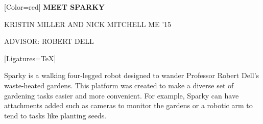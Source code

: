 \documentclass{article}
\begin{document}
{

	[Color=red]
	\fontsize{0.8in}{0.6in}\selectfont 
	\bfseries
	MEET SPARKY
}

\vspace{0.25in}

{
	\fontsize{0.55in}{0.6in}\selectfont
	KRISTIN MILLER {\fontsize{0.4in}{0.6in}\selectfont AND} NICK MITCHELL {\fontsize{0.4in}{0.6in}\selectfont ME '15}
}

\vspace{0.1in}

{
	\fontsize{0.4in}{0.4in}\selectfont
	ADVISOR: ROBERT DELL
}

\vspace{0.2in}

{
	[Ligatures=TeX]
	\fontsize{0.41in}{0.46in}\selectfont

	Sparky is a walking four-legged robot designed to wander Professor Robert
	Dell’s waste-heated gardens. This platform was created to make a diverse
	set of gardening tasks easier and more convenient. For example, Sparky can
	have attachments added such as cameras to monitor the gardens or a robotic
	arm to tend to tasks like planting seeds.

}
\end{document}
